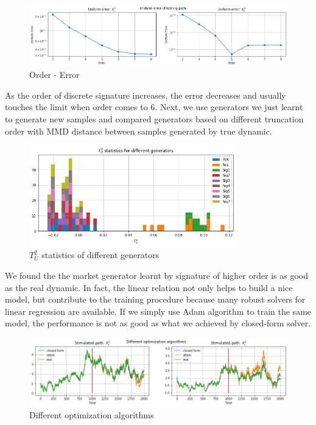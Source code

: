 \documentclass[12pt]{report}
\theoremstyle{definition}
\theoremstyle{remark}
\begin{document}
 \begin{figure}[H]
    \centering
    \includegraphics[width=\textwidth]{figs/res4.png}
    \caption{ Order - Error}
\end{figure}
As the order of discrete signature increases, the error decreases and usually touches the limit when order comes to 6. 
Next, we use generators we just learnt to generate new samples and compared generators based on different truncation order with MMD distance between samples generated by true dynamic. 
\begin{figure}[H]
  \centering
  \includegraphics[width=0.8\textwidth]{figs/res5.png}
  \caption{$T_{U}^{2}$ statistics of different generators}
\end{figure}
We found the the market generator learnt by signature of higher order is as good as the real dynamic. In fact, the linear relation not only helps to build a nice model, but contribute to the training procedure because many robust solvers for linear regression are available. If we simply use Adam algorithm to train the same model, the performance is not as good as what we achieved by closed-form solver. 
\begin{figure}[H]
  \centering
  \includegraphics[width=\textwidth]{figs/res6.png}
  \caption{Different optimization algorithms}
\end{figure}
\end{document}

